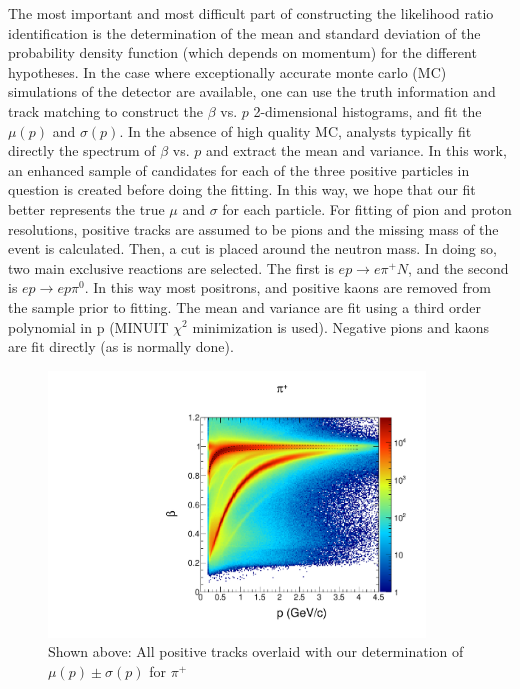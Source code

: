 The most important and most difficult part of constructing the likelihood ratio identification is the determination of the mean and standard deviation of the probability density function (which depends on momentum) for the different hypotheses.  In the case where exceptionally accurate monte carlo (MC) simulations of the detector are available, one can use the truth information and track matching to construct the $\beta$ vs. $p$ 2-dimensional histograms, and fit the $\mu(p)$ and $\sigma(p)$.  In the absence of high quality MC, analysts typically fit directly the spectrum of $\beta$ vs. $p$ and extract the mean and variance.  In this work, an enhanced sample of candidates for each of the three positive particles in question is created before doing the fitting.  In this way, we hope that our fit better represents the true $\mu$ and $\sigma$ for each particle.  For fitting of pion and proton resolutions, positive tracks are assumed to be pions and the missing mass of the event is calculated.  Then, a cut is placed around the neutron mass.  In doing so, two main exclusive reactions are selected.  The first is $ep \rightarrow e\pi^+N$, and the second is $ep \rightarrow ep\pi^0$.  In this way most positrons, and positive kaons are removed from the sample prior to fitting.  The mean and variance are fit using a third order polynomial in p (MINUIT $\chi^2$ minimization is used).  Negative pions and kaons are fit directly (as is normally done).

\begin{figure}
  \begin{center}
    \includegraphics[width=10cm]{image/plots/hadron-id/beautiful_pbeta_pip.pdf}
    \caption{ Shown above: All positive tracks overlaid with our determination of $\mu(p) \pm \sigma(p)$ for $\pi^+$}
  \end{center}
\end{figure}

